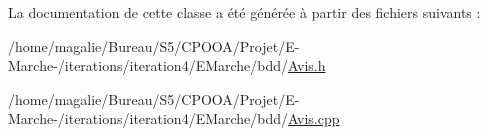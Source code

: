 La documentation de cette classe a été générée à partir des fichiers suivants \-:\begin{DoxyCompactItemize}
\item 
/home/magalie/\-Bureau/\-S5/\-C\-P\-O\-O\-A/\-Projet/\-E-\/\-Marche-\//iterations/iteration4/\-E\-Marche/bdd/\hyperlink{_avis_8h}{Avis.\-h}\item 
/home/magalie/\-Bureau/\-S5/\-C\-P\-O\-O\-A/\-Projet/\-E-\/\-Marche-\//iterations/iteration4/\-E\-Marche/bdd/\hyperlink{_avis_8cpp}{Avis.\-cpp}\end{DoxyCompactItemize}
